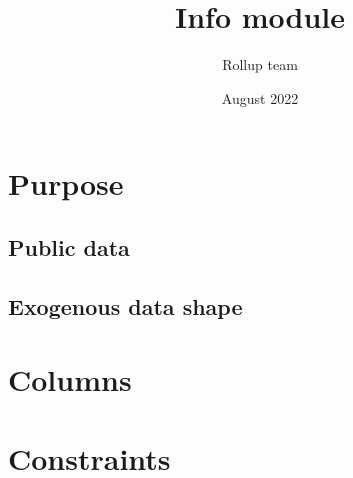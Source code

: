 \documentclass{article}
\title{Info module}
\author{Rollup team}
\date{August 2022}
\begin{document}
\maketitle
\tableofcontents

\section{Purpose}
	

\subsection{Public data}
	
\subsection{Exogenous data shape}
	

\section{Columns}
	

\section{Constraints}
	
\end{document}
